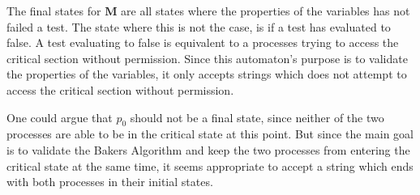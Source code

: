 

The final states for $\mathbf{M}$ are all states where the properties of the variables has not failed a test. The state where this is not the case, is if a test has evaluated to false. A test evaluating to false is equivalent to a processes trying to access the critical section without permission. Since this automaton's purpose is to validate the properties of the variables, it only accepts strings which does not attempt to access the critical section without permission. 

One could argue that $p_0$ should not be a final state, since neither of the two processes are able to be in the critical state at this point. But since the main goal is to validate the Bakers Algorithm and keep the two processes from entering the critical state at the same time, it seems appropriate to accept a string which ends with both processes in their initial states. 